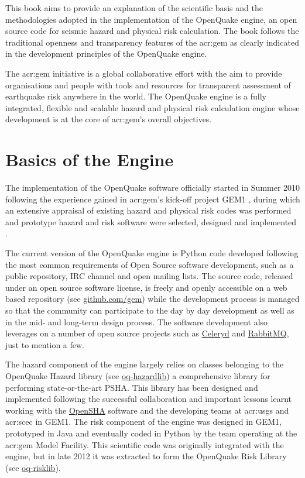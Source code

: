 This book aims to provide an explanation of the scientific basis 
and the methodologies adopted in the implementation of the OpenQuake engine, an open source code for seismic hazard and physical risk calculation. 
%
The book follows the traditional openness and transparency features of the 
\gls{acr:gem} as clearly indicated in the development principles of 
the OpenQuake engine. 

%
The \gls{acr:gem} initiative is a global collaborative effort with the aim to provide organisations and people with tools and resources for transparent assessment of earthquake risk anywhere in the world.
%
The OpenQuake engine is a fully integrated, flexible and scalable hazard and physical risk 
calculation engine whose development is at the core of \gls{acr:gem}'s
overall objectives.
\section{Basics of the Engine}
The implementation of the OpenQuake software officially started in Summer 2010 
following the experience gained in \gls{acr:gem}'s kick-off project GEM1 
\citep{gemfoundation2010}, during which an extensive appraisal of existing hazard 
and physical risk codes was performed \citep{danciu2010,crowley2010}
and prototype hazard and risk software were selected, designed and
implemented \citep{pagani2010,crowley2010a}.

The current version of the OpenQuake engine is Python code developed 
following the most common requirements of Open Source 
software development, such as a public repository, IRC channel and open mailing lists. 
The source code, released under an open source software license,
is freely and openly accessible on a web based repository 
(see \href{http://github.com/gem}{github.com/gem}) while the 
development process is managed so that the community can participate 
to the day by day development as well as in the mid- and long-term 
design process. 
%
The software development also leverages on a number of open source projects 
such as \href {http://celeryproject.org}{Celeryd} and \href{http://www.rabbitmq.com}{RabbitMQ}, just to mention a few.

The hazard component of the engine largely relies on classes belonging to the OpenQuake Hazard library (see \href{https://github.com/gem/oq-hazardlib}{oq-hazardlib}) a comprehensive library for performing state-or-the-art PSHA. This library has been designed and implemented following the successful collaboration and important lessons learnt working with the \href{http://www.opensha.org}{OpenSHA} software and the developing teams at \gls{acr:usgs} and 
\gls{acr:scec} in GEM1. 
%
The risk component of the engine was designed in GEM1, prototyped in Java and eventually
coded in Python by the team operating at the \gls{acr:gem} 
Model Facility. This scientific code was originally integrated with the engine, but in late 2012 it was extracted to form the OpenQuake Risk Library (see \href{https://github.com/gem/oq-risklib}{oq-risklib}).

